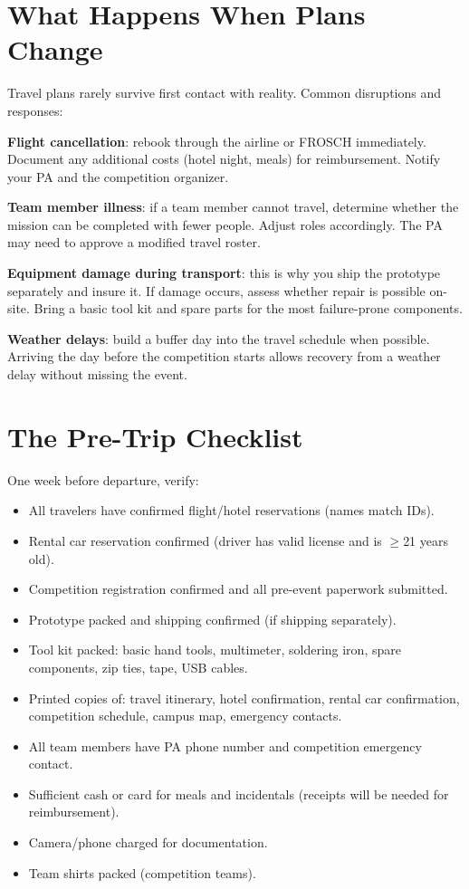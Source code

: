 \section{What Happens When Plans Change}
Travel plans rarely survive first contact with reality. Common disruptions and responses:

\textbf{Flight cancellation}: rebook through the airline or FROSCH immediately. Document any additional costs (hotel night, meals) for reimbursement. Notify your PA and the competition organizer.

\textbf{Team member illness}: if a team member cannot travel, determine whether the mission can be completed with fewer people. Adjust roles accordingly. The PA may need to approve a modified travel roster.

\textbf{Equipment damage during transport}: this is why you ship the prototype separately and insure it. If damage occurs, assess whether repair is possible on-site. Bring a basic tool kit and spare parts for the most failure-prone components.

\textbf{Weather delays}: build a buffer day into the travel schedule when possible. Arriving the day before the competition starts allows recovery from a weather delay without missing the event.



\section{The Pre-Trip Checklist}
One week before departure, verify:

\begin{itemize}[nosep,leftmargin=1.5em]
\item All travelers have confirmed flight/hotel reservations (names match IDs).
\item Rental car reservation confirmed (driver has valid license and is $\geq$21 years old).
\item Competition registration confirmed and all pre-event paperwork submitted.
\item Prototype packed and shipping confirmed (if shipping separately).
\item Tool kit packed: basic hand tools, multimeter, soldering iron, spare components, zip ties, tape, USB cables.
\item Printed copies of: travel itinerary, hotel confirmation, rental car confirmation, competition schedule, campus map, emergency contacts.
\item All team members have PA phone number and competition emergency contact.
\item Sufficient cash or card for meals and incidentals (receipts will be needed for reimbursement).
\item Camera/phone charged for documentation.
\item Team shirts packed (competition teams).
\end{itemize}

